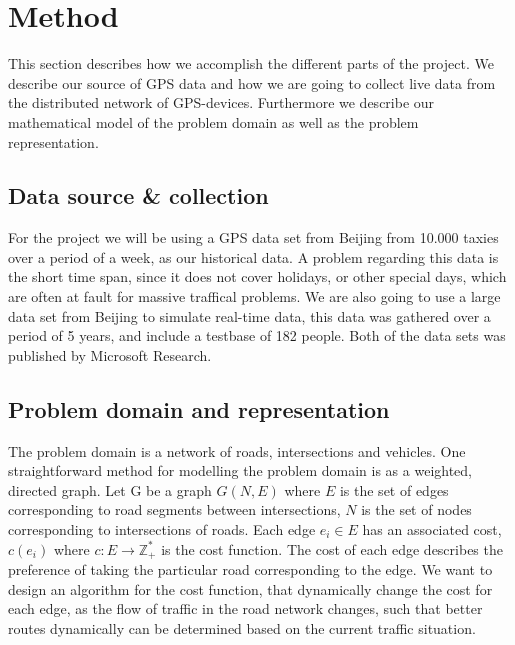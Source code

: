 \section{Method}
This section describes how we accomplish the different parts of the project. We describe our source of GPS data and how we are going to collect live data from the distributed network of GPS-devices. Furthermore we describe our mathematical model of the problem domain as well as the problem representation.

\subsection*{Data source \& collection}
For the project we will be using a GPS data set from Beijing from 10.000 taxies over a period of a week, as our historical data\cite{Tdrive}. A problem regarding this data is the short time span, since it does not cover holidays, or other special days, which are often at fault for massive traffical problems. We are also going to use a large data set from Beijing to simulate real-time data, this data was gathered over a period of 5 years, and include a testbase of 182 people\cite{Geolife}. Both of the data sets was published by Microsoft Research.

\subsection*{Problem domain and representation}
The problem domain is a network of roads, intersections and vehicles. One straightforward method for modelling the problem domain is as a weighted, directed graph. Let G be a graph $G(N,E)$ where $E$ is the set of edges corresponding to road segments between intersections, $N$ is the set of nodes corresponding to intersections of roads. Each edge $e_i \in E$ has an associated cost, $c(e_i)$ where  $c: E \rightarrow \mathbb Z_+^*$ is the cost function. The cost of each edge describes the preference of taking the particular road corresponding to the edge. We want to design an algorithm for the cost function, that dynamically change the cost for each edge, as the flow of traffic in the road network changes, such that better routes dynamically can be determined based on the current traffic situation.

